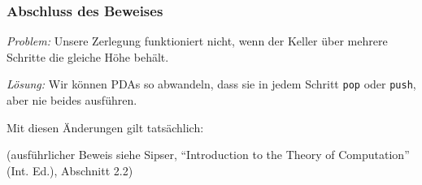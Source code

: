 \documentclass[onlymath]{beamer}
\begin{document}
\begin{frame}\frametitle{Abschluss des Beweises}

\emph{Problem:} Unsere Zerlegung funktioniert nicht, wenn der Keller über mehrere Schritte die gleiche Höhe behält.
\medskip

\emph{Lösung:} Wir können PDAs so abwandeln, dass sie in jedem Schritt \texttt{pop} oder
\texttt{push}, aber nie beides ausführen.


Mit diesen Änderungen gilt tatsächlich:

{\tiny
(ausführlicher Beweis siehe Sipser, "`Introduction to the Theory of Computation"' (Int. Ed.), Abschnitt 2.2)
}

\end{frame}
\end{document}
